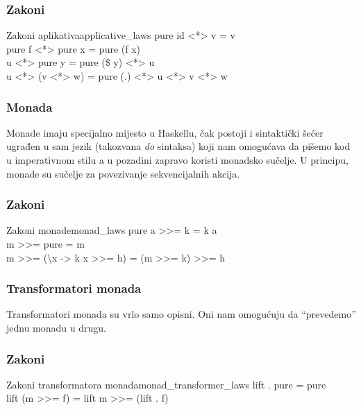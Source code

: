 \subsubsection*{Zakoni}

\begin{code}{Zakoni aplikativa}{applicative_laws}
    pure id <*> v = v\\
    pure f <*> pure x = pure (f x)\\
    u <*> pure y = pure (\$ y) <*> u\\
    u <*> (v <*> w) = pure (.) <*> u <*> v <*> w
\end{code}

\subsubsection{Monada}

Monade imaju specijalno mijesto u Haskellu, čak postoji i sintaktički šećer  ugrađen u sam jezik (takozvana \textit{do} sintaksa) koji nam omogućava da pišemo kod u imperativnom stilu a u pozadini zapravo koristi monadsko sučelje. U principu, monade su sučelje za povezivanje sekvencijalnih akcija.


\subsubsection*{Zakoni}

\begin{code}{Zakoni monade}{monad_laws}
    pure a >>= k = k a\\
    m >>= pure = m\\
    m >>= (\textbackslash x -> k x >>= h) = (m >>= k) >>= h
\end{code}

\subsubsection{Transformatori monada}

Transformatori monada su vrlo samo opisni. Oni nam omogućuju da ``prevedemo'' jednu monadu u drugu.


\subsubsection*{Zakoni}

\begin{code}{Zakoni transformatora monada}{monad_transformer_laws}
    lift . pure = pure\\
    lift (m >>= f) = lift m >>= (lift . f)
\end{code}

